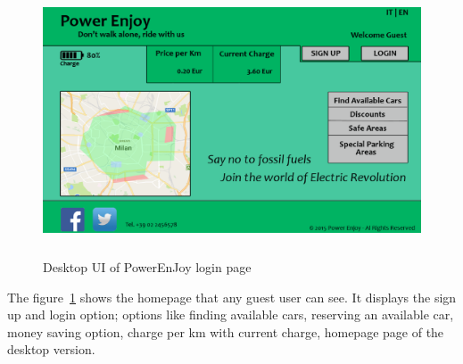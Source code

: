 \begin{figure}[t]
	\centering
	\includegraphics[height=8cm,keepaspectratio]{figures/desktop.eps}
	\caption{Desktop UI of PowerEnJoy login page}
	\label{fig:desktop}
\end{figure}

The figure~\ref{fig:desktop} shows the homepage that any guest user can see. It displays the sign up and login option; options like finding available cars, reserving an available car, money saving option, charge per km with current charge, homepage page of the desktop version.

